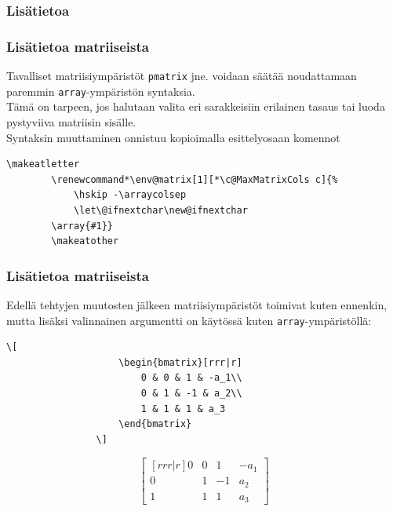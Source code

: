 \documentclass[handout,hyperref={colorlinks=true}]{beamer}
\makeatletter
\theoremstyle{remark}
\newcommand{\vaihto}{\\ \vspace{10pt}}
\renewcommand*\env@matrix[1][*\c@MaxMatrixCols c]{%
    \hskip -\arraycolsep
    \let\@ifnextchar\new@ifnextchar
\array{#1}}
\makeatother
\begin{document}
\subsubsection{Lisätietoa}
\begin{frame}[fragile]
    \frametitle{Lisätietoa matriiseista}
    Tavalliset matriisiympäristöt \verb-pmatrix- jne. voidaan säätää noudattamaan paremmin \verb-array--ympäristön syntaksia.
    \vaihto
    Tämä on tarpeen, jos halutaan valita eri sarakkeisiin erilainen tasaus tai luoda pystyviiva matriisin sisälle. 
    \vaihto
    Syntaksin muuttaminen onnistuu kopioimalla esittelyosaan komennot\vaihto
    \begin{Verbatim}[frame=single]
        \makeatletter
        \renewcommand*\env@matrix[1][*\c@MaxMatrixCols c]{%
            \hskip -\arraycolsep
            \let\@ifnextchar\new@ifnextchar
        \array{#1}}
        \makeatother
    \end{Verbatim}
\end{frame}
\begin{frame}[fragile]
    \frametitle{Lisätietoa matriiseista}
    Edellä tehtyjen muutosten jälkeen matriisiympäristöt toimivat kuten ennenkin, mutta lisäksi valinnainen argumentti on käytössä kuten \verb-array--ympäristöllä:
    \vaihto
    \begin{minipage}{4cm}
        \begin{scriptsize}
            \begin{Verbatim}[frame=single]
                \[
                    \begin{bmatrix}[rrr|r]
                        0 & 0 & 1 & -a_1\\
                        0 & 1 & -1 & a_2\\
                        1 & 1 & 1 & a_3
                    \end{bmatrix}
                \]
            \end{Verbatim}
        \end{scriptsize}
    \end{minipage}
    \begin{minipage}{4cm}
        \[
            \begin{bmatrix}[rrr|r]
                0 & 0 & 1 & -a_1\\
                0 & 1 & -1 & a_2\\
                1 & 1 & 1 & a_3
            \end{bmatrix}
        \]
    \end{minipage}
\end{frame}
\end{document}
